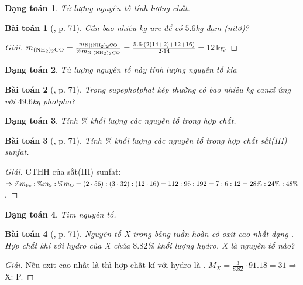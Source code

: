 \documentclass{article}
\newtheorem{baitoan}{Bài toán}
\newtheorem{dangtoan}{Dạng toán}
\begin{document}
\begin{dangtoan}
	Từ lượng nguyên tố tính lượng chất.
\end{dangtoan}

\begin{baitoan}[\cite{Tuan2022}, p. 71]
	Cần bao nhiêu \emph{kg} ure \emph{} để có $5.6$\emph{kg} đạm (nitơ)?
\end{baitoan}

\begin{proof}[Giải]
	$m_{\ce{(NH2)2CO}} = \frac{m_{\ce{N|(NH2)2CO}}}{\%m_{\ce{N|(NH2)2CO}}} = \frac{5.6\cdot(2(14 + 2) + 12 + 16)}{2\cdot14} = 12$kg.
\end{proof}

\begin{dangtoan}
	Từ lượng nguyên tố này tính lượng nguyên tố kia
\end{dangtoan}

\begin{baitoan}[\cite{Tuan2022}, p. 71]
	Trong supephotphat kép thường có bao nhiêu kg canxi ứng với $49.6$\emph{kg} photpho?
\end{baitoan}

\begin{dangtoan}
	Tính \% khối lượng các nguyên tố trong hợp chất.
\end{dangtoan}

\begin{baitoan}[\cite{Tuan2022}, p. 71]
	Tính \% khối lượng các nguyên tố trong hợp chất sắt(III) sunfat.
\end{baitoan}

\begin{proof}[Giải]
	CTHH của sắt(III) sunfat: $\Rightarrow\%m_{\ce{Fe}}:\%m_{\ce{S}}:\%m_{\ce{O}} = (2\cdot56):(3\cdot32):(12\cdot16) = 112:96:192 = 7:6:12 = 28\%:24\%:48\%$.
\end{proof}

\begin{dangtoan}
	Tìm nguyên tố.
\end{dangtoan}

\begin{baitoan}[\cite{Tuan2022}, p. 71]
	Nguyên tố X trong bảng tuần hoàn có oxit cao nhất dạng \emph{}. Hợp chất khí với hydro của X chứa $8.82$\% khối lượng hydro. X là nguyên tố nào?
\end{baitoan}

\begin{proof}[Giải]
	Nếu oxit cao nhất là  thì hợp chất kí với hydro là . $M_X = \frac{3}{8.82}\cdot91.18 = 31\Rightarrow$ X: P.
\end{proof}



\printbibliography[heading=bibintoc]
	
\end{document}
